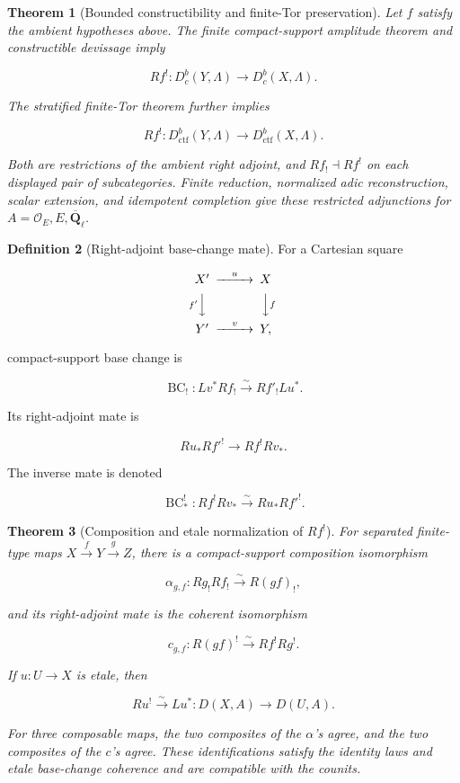 \documentclass[10pt]{article}
\newtheorem{theorem}{Theorem}[section]
\theoremstyle{definition}
\newtheorem{definition}[theorem]{Definition}
\newcommand{\Qlb}{\overline{\mathbf Q}_\ell}
\newcommand{\OO}{\mathcal O}
\newcommand{\Dbc}{D^b_c}
\newcommand{\Dctf}{D^b_{\mathrm{ctf}}}
\begin{document}
\begin{theorem}[Bounded constructibility and finite-Tor preservation]
Let \(f\) satisfy the ambient hypotheses above.  The finite compact-support
amplitude theorem and constructible devissage imply

\[
 Rf^!: \Dbc(Y,\Lambda)\longrightarrow\Dbc(X,\Lambda).
\]

The stratified finite-Tor theorem further implies

\[
 Rf^!: \Dctf(Y,\Lambda)\longrightarrow\Dctf(X,\Lambda).
\]

Both are restrictions of the ambient right adjoint, and \(Rf_!\dashv Rf^!\)
on each displayed pair of subcategories.  Finite reduction, normalized adic
reconstruction, scalar extension, and idempotent completion give these
restricted adjunctions for \(A=\OO_E,E,\Qlb\).
\end{theorem}

\begin{definition}[Right-adjoint base-change mate]
For a Cartesian square

\[
\begin{CD}
X' @>{u}>> X\\
@V{f'}VV @VV{f}V\\
Y' @>{v}>> Y,
\end{CD}
\]

compact-support base change is

\[
 \operatorname{BC}_!:Lv^*Rf_!\xrightarrow{\sim}Rf'_!Lu^*.
\]

Its right-adjoint mate is

\[
 Ru_*Rf'^!\longrightarrow Rf^!Rv_*.
\]

The inverse mate is denoted

\[
 \operatorname{BC}^!_*:Rf^!Rv_*\xrightarrow{\sim}Ru_*Rf'^!.
\]
\end{definition}

\begin{theorem}[Composition and etale normalization of \(Rf^!\)]
For separated finite-type maps \(X\xrightarrow fY\xrightarrow gZ\), there is
a compact-support composition isomorphism

\[
 \alpha_{g,f}:Rg_!Rf_!\xrightarrow{\sim}R(gf)_!,
\]

and its right-adjoint mate is the coherent isomorphism

\[
 c_{g,f}:R(gf)^!\xrightarrow{\sim}Rf^!Rg^!.
\]

If \(u:U\to X\) is etale, then

\[
 Ru^!\xrightarrow{\sim}Lu^*:D(X,A)\longrightarrow D(U,A).
\]

For three composable maps, the two composites of the \(\alpha\)'s agree, and
the two composites of the \(c\)'s agree.  These identifications satisfy the
identity laws and etale base-change coherence and are compatible with the
counits.
\end{theorem}
\end{document}
